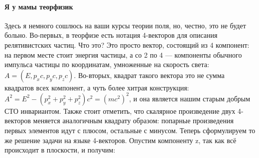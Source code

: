 \documentclass[12pt]{article}
\begin{document}
\paragraph{Я у мамы теорфизик} Здесь я немного сошлюсь на ваши курсы теории поля, но, честно, это не будет больно. Во-первых, в теорфизе есть нотация 4-векторов для описания релятивистских частиц. Что это? Это просто вектор, состоящий из 4 компонент: на первом месте стоит энергия частицы, а со 2 по 4 --- компоненты обычного импульса частицы по координатам, умноженные на скорость света: $A = (E, p_xc, p_yc, p_zc)$. Во-вторых, квадрат такого вектора это не сумма квадратов всех компонент, а чуть более хитрая конструкция: $A^2 = E^2 -(p_x^2+p_y^2+p_z^2)c^2 = (mc^2)^2$, и она является нашим старым добрым СТО инвариантом. Также стоит отметить, что скалярное произведение двух 4-векторов меняется аналогичным квадрату образом: попарные произведения первых элементов идут с плюсом, остальные с минусом. Теперь сформулируем то же решение задачи на языке 4-векторов. Опустим компоненту z, так как всё происходит в плоскости, и получим:
\end{document}
